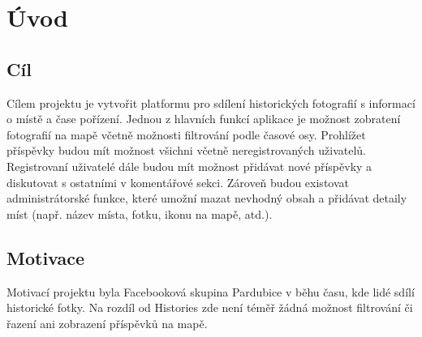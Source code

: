 \chapter{Úvod}
\section{Cíl}
Cílem projektu je vytvořit platformu pro sdílení historických fotografií
s informací o místě a čase pořízení. Jednou z hlavních funkcí aplikace je možnost
zobratení fotografií na mapě včetně možnosti filtrování podle časové osy. Prohlížet 
příspěvky budou mít možnost všichni včetně neregistrovaných uživatelů. Registrovaní 
uživatelé dále budou mít možnost přidávat nové příspěvky a diskutovat s ostatními v
komentářové sekci. Zároveň budou existovat administrátorské funkce, které umožní mazat
nevhodný obsah a přidávat detaily míst (např. název místa, fotku, ikonu na mapě, atd.).

\section{Motivace}
Motivací projektu byla Facebooková skupina Pardubice v běhu času\cite{PardubiceVBehuCasuFB}, kde lidé 
sdílí historické fotky. Na rozdíl od Histories zde není téměř žádná možnost filtrování či 
řazení ani zobrazení příspěvků na mapě.
